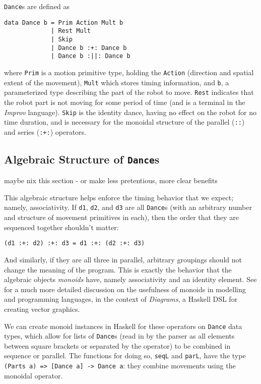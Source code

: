 \documentclass[sigconf]{acmart}
\begin{document}
\texttt{Dance}s are defined as

\begin{verbatim}
data Dance b = Prim Action Mult b
             | Rest Mult
             | Skip
             | Dance b :+: Dance b
             | Dance b :||: Dance b
\end{verbatim}

where \texttt{Prim} is a motion primitive type, holding the
\texttt{Action} (direction and spatial extent of the movement),
\texttt{Mult} which stores timing information, and \texttt{b}, a parameterized type describing the
part of the robot to move. \texttt{Rest} indicates that the robot part
is not moving for some period of time (and is a terminal in the
\emph{Improv} language). \texttt{Skip} is the identity dance, having no
effect on the robot for no time duration, and is necessary for the
monoidal structure of the parallel (\texttt{:\textbar{}\textbar{}:}) and
series (\texttt{:+:}) operators.

\subsection{\texorpdfstring{Algebraic Structure of
\texttt{Dance}s}{Algebraic Structure of Dances}}\label{algebraic-structure-of-dances}

{\color{red} maybe nix this section - or make less pretentious, more clear
benefits}

This algebraic structure helps enforce the timing behavior that we
expect; namely, associativity. If \texttt{d1}, \texttt{d2}, and
\texttt{d3} are all \texttt{Dance}s (with an arbitrary number and
structure of movement primitives in each), then the order that they are
sequenced together shouldn't matter:

\begin{verbatim}
(d1 :+: d2) :+: d3 = d1 :+: (d2 :+: d3)
\end{verbatim}

And similarly, if they are all three in parallel, arbitrary groupings
should not change the meaning of the program. This is exactly the
behavior that the algebraic objects \emph{monoids} have, namely
associativity and an identity element. See \cite{yorgey2012monoids} for a much more
detailed discussion on the usefulness of monoids in modelling and
programming languages, in the context of \emph{Diagrams}, a Haskell DSL
for creating vector graphics.

We can create monoid instances in Haskell for these operators on
\texttt{Dance} data types, which allow for lists of \texttt{Dance}s
(read in by the parser as all elements between square brackets or
separated by the \texttt{\textbar{}\textbar{}} operator) to be combined
in sequence or parallel. The functions for doing so, \texttt{seqL} and
\texttt{parL}, have the type
\texttt{(Parts\ a)\ =\textgreater{}\ {[}Dance\ a{]}\ -\textgreater{}\ Dance\ a}:
they combine movements using the monoidal operator.
\end{document}
